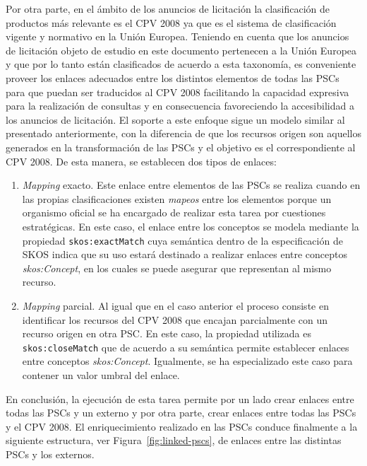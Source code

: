 Por otra parte, en el ámbito de los anuncios de licitación la clasificación de productos más relevante es el \gls{CPV} 2008 ya que 
es el sistema de clasificación vigente y normativo en la Unión Europea. Teniendo en cuenta que los anuncios de licitación 
objeto de estudio en este documento pertenecen a la Unión Europea y que por lo tanto están clasificados de acuerdo a esta 
taxonomía, es conveniente proveer los enlaces adecuados entre los distintos elementos de todas las PSCs para que puedan 
ser traducidos al CPV 2008 facilitando la capacidad expresiva para la realización de consultas y en consecuencia favoreciendo 
la accesibilidad a los anuncios de licitación. El soporte a este enfoque sigue un modelo similar al presentado anteriormente, 
con la diferencia de que los recursos origen son aquellos generados en la transformación de las \gls{PSC}s y el \dataset objetivo 
es el correspondiente al CPV 2008. De esta manera, se establecen dos tipos de enlaces:
\begin{enumerate}
 \item \textit{Mapping} exacto. Este enlace entre elementos de las PSCs se realiza cuando en las propias clasificaciones existen 
\textit{mapeos} entre los elementos porque un organismo oficial se ha encargado de realizar esta tarea por cuestiones estratégicas. En este caso, 
el enlace entre los conceptos se modela mediante la propiedad \texttt{skos:exactMatch} cuya semántica dentro de la especificación 
de SKOS indica que su uso estará destinado a realizar enlaces entre conceptos \textit{skos:Concept}, en los cuales se puede asegurar 
que representan al mismo recurso.
\item \textit{Mapping} parcial. Al igual que en el caso anterior el proceso consiste en identificar los recursos del CPV 2008 que encajan 
parcialmente con un recurso origen en otra PSC. En este caso, la propiedad utilizada es \texttt{skos:closeMatch} que de acuerdo 
a su semántica permite establecer enlaces entre conceptos \textit{skos:Concept}. Igualmente, se ha especializado este caso 
para contener un valor umbral del enlace.
\end{enumerate}
 
En conclusión, la ejecución de esta tarea permite por un lado crear enlaces entre todas las PSCs y un \dataset externo y por otra parte, 
crear enlaces entre todas las PSCs y el CPV 2008. El enriquecimiento realizado en las PSCs conduce finalmente a la siguiente estructura, 
ver Figura~\ref{fig:linked-pscs}, de enlaces entre las distintas PSCs y los \datasets externos.

